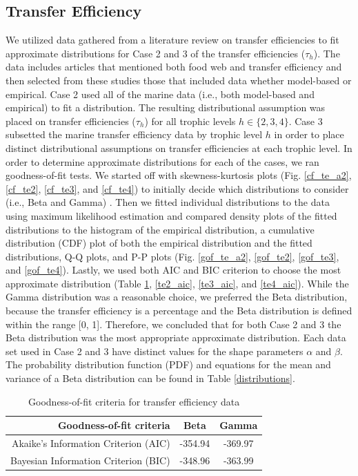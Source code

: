 \documentclass[oneside,12pt,final]{sty/ucthesis-CA2012}
\let\cite\citep                             %
\begin{document}
\begin{mainmatter}
\subsection{Transfer Efficiency}
We utilized data gathered from a literature review on transfer efficiencies to fit approximate distributions for Case 2 and 3 of the transfer efficiencies ($\tau_h$). The data includes articles that mentioned both food web and transfer efficiency and then selected from these studies those that included data whether model-based or empirical. Case 2 used all of the marine data (i.e., both model-based and empirical) to fit a distribution. The resulting distributional assumption was placed on transfer efficiencies ($\tau_h$) for all trophic levels $h \in \{2, 3, 4\}$. Case 3 subsetted the marine transfer efficiency data by trophic level $h$ in order to place distinct distributional assumptions on transfer efficiencies at each trophic level. In order to determine approximate distributions for each of the cases, we ran goodness-of-fit tests. We started off with skewness-kurtosis plots (Fig. \ref{cf_te_a2}, \ref{cf_te2}, \ref{cf_te3}, and \ref{cf_te4}) to initially decide which distributions to consider (i.e., Beta and Gamma) \cite{fitdistrplus}. Then we fitted individual distributions to the data using maximum likelihood estimation and compared density plots of the fitted distributions to the histogram of the empirical distribution, a cumulative distribution (CDF) plot of both the empirical distribution and the fitted distributions, Q-Q plots, and P-P plots (Fig. \ref{gof_te_a2}, \ref{gof_te2}, \ref{gof_te3}, and \ref{gof_te4}). Lastly, we used both AIC and BIC criterion to choose the most approximate distribution (Table \ref{te_aic_a2}, \ref{te2_aic}, \ref{te3_aic}, and \ref{te4_aic}). While the Gamma distribution was a reasonable choice, we preferred the Beta distribution, because the transfer efficiency is a percentage and the Beta distribution is defined within the range [0, 1]. Therefore, we concluded that for both Case 2 and 3 the Beta distribution was the most appropriate approximate distribution. Each data set used in Case 2 and 3 have distinct values for the shape parameters $\alpha$ and $\beta$. The probability distribution function (PDF) and equations for the mean and variance of a Beta distribution can be found in Table \ref{distributions}.

\begin{table}[H]
\centering
\caption{Goodness-of-fit criteria for transfer efficiency data}
\begin{tabular}{r|c|c}
  \hline \small
 Goodness-of-fit criteria & Beta  & Gamma \\ 
   \hline
   Akaike's Information Criterion (AIC) & -354.94 & -369.97 \\   
   Bayesian Information Criterion (BIC) & -348.96 &  -363.99  \\
   \hline
\end{tabular} 
\label{te_aic_a2}
\end{table}


\end{mainmatter}
\end{document}
